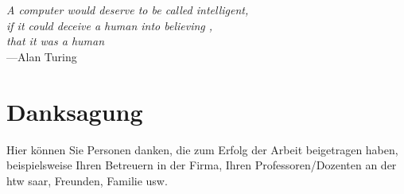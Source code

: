 
\begin{flushright}{\slshape    
    A computer would deserve to be called intelligent, \\ 
    if it could deceive a human into believing , \\ 
    that it was a human} \cite{knuth:1976} \\ \medskip
    ---Alan Turing 
\end{flushright}

\bigskip

\begingroup
	\let\clearpage\relax
	\let\cleardoublepage\relax
	\let\cleardoublepage\relax
	\chapter*{Danksagung}
	Hier können Sie Personen danken, die zum Erfolg der Arbeit beigetragen haben, beispielsweise Ihren Betreuern in der Firma, Ihren Professoren/Dozenten an der htw saar, Freunden, Familie usw.




\endgroup

